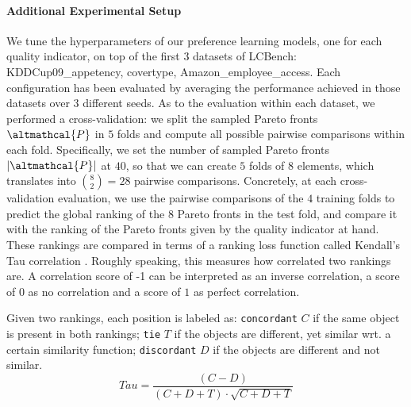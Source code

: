 \paragraph{Additional Experimental Setup}
We tune the hyperparameters of our preference learning models, one for each quality indicator, on top of the first 3 datasets of LCBench: KDDCup09\_appetency, covertype, Amazon\_employee\_access.
Each configuration has been evaluated by averaging the performance achieved in those datasets over $3$ different seeds.
As to the evaluation within each dataset, we performed a cross-validation: we split the sampled Pareto fronts $\altmathcal{P}$ in $5$ folds and compute all possible pairwise comparisons within each fold. 
Specifically, we set the number of sampled Pareto fronts $|\altmathcal{P}|$ at $40$, so that we can create $5$ folds of $8$ elements, which translates into $\binom{8}{2} = 28$ pairwise comparisons.
Concretely, at each cross-validation evaluation, we use the pairwise comparisons of the $4$ training folds to predict the global ranking of the $8$ Pareto fronts in the test fold, and compare it with the ranking of the Pareto fronts given by the quality indicator at hand.
These rankings are compared in terms of a ranking loss function called Kendall's Tau correlation \cite{kendall-article48}.
Roughly speaking, this measures how correlated two rankings are. A correlation score of -1 can be interpreted as an inverse correlation, a score of $0$ as no correlation and a score of $1$ as perfect correlation.

\begin{definition}
    Given two rankings, each position is labeled as: \texttt{concordant} $C$ if the same object is present in both rankings; \texttt{tie} $T$  if the objects are different, yet similar wrt. a certain similarity function; \texttt{discordant} $D$  if the objects are different and not similar.
    \begin{equation*}
        \textit{Tau} = \frac{(C - D)}{(C + D + T) \cdot \sqrt{C + D + T}}
    \end{equation*}
\end{definition}

